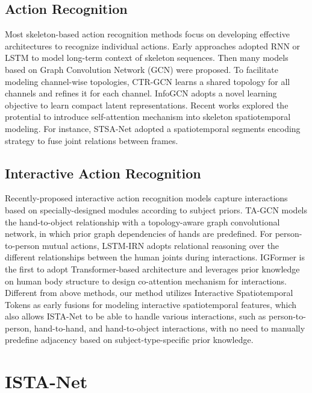 \documentclass[letterpaper, 10 pt, conference]{ieeeconf}
\begin{document}
\subsection{Action Recognition}
Most skeleton-based action recognition methods focus on developing effective architectures to recognize individual actions. Early approaches\cite{Co-LSTM2016,ST-LSTM2016, GCA2017, VA-LSTM2017, 2s-GCA2018} adopted RNN or LSTM to model long-term context of skeleton sequences. Then many models based on Graph Convolution Network (GCN) were proposed\cite{ST-GCN2018,AS-GCN2019, 2s-AGCN2019,MS-G3D2020,CTR-GCN2021,LST2022,tcagcn2022,hdgcn2022,InfoGCN2022}. To facilitate modeling channel-wise topologies, CTR-GCN \cite{CTR-GCN2021} learns a shared topology for all channels and refines it for each channel. InfoGCN\cite{InfoGCN2022} adopts a novel learning objective to learn compact latent representations. Recent works explored the protential to introduce self-attention mechanism into skeleton spatiotemporal modeling\cite{dstanet2020,STSA-Net2023}. For instance, STSA-Net\cite{STSA-Net2023} adopted a spatiotemporal segments encoding strategy to fuse joint relations between frames. 

\subsection{Interactive Action Recognition}
Recently-proposed interactive action recognition models \cite{H+O2019,H2O_TA-GCN2021,LSTM-IRN2022,igformer2022} capture interactions based on specially-designed modules according to subject priors. TA-GCN \cite{H2O_TA-GCN2021} models the hand-to-object relationship with a topology-aware graph convolutional network, in which prior graph dependencies of hands are predefined. For person-to-person mutual actions, LSTM-IRN \cite{LSTM-IRN2022} adopts relational reasoning over the different relationships between the human joints during interactions. IGFormer \cite{igformer2022} is the first to adopt Transformer-based architecture and leverages prior knowledge on human body structure to design co-attention mechanism for interactions. Different from above methods, our method utilizes Interactive Spatiotemporal Tokens as early fusions for modeling interactive spatiotemporal features, which also allows ISTA-Net to be able to handle various interactions, such as person-to-person, hand-to-hand, and hand-to-object interactions, with no need to manually predefine adjacency based on subject-type-specific prior knowledge.

\section{ISTA-Net}
\end{document}
